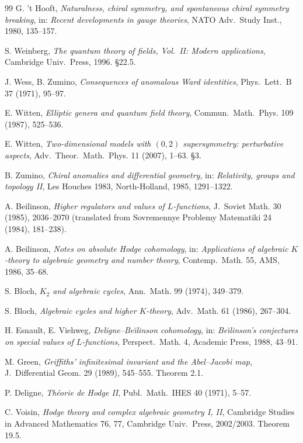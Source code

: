 \documentclass[11pt,reqno]{amsart}
\theoremstyle{plain}
\theoremstyle{definition}
\theoremstyle{remark}
\begin{document}
\begin{thebibliography}{99}
 G. 't Hooft, \emph{Naturalness, chiral symmetry, and spontaneous chiral symmetry breaking}, in: \emph{Recent developments in gauge theories}, NATO Adv.~Study Inst., 1980, 135--157.

 S. Weinberg, \emph{The quantum theory of fields, Vol.~II: Modern applications}, Cambridge Univ.~Press, 1996. \S22.5.

 J. Wess, B. Zumino, \emph{Consequences of anomalous Ward identities}, Phys.~Lett.~B 37 (1971), 95--97.

 E. Witten, \emph{Elliptic genera and quantum field theory}, Commun.~Math.~Phys. 109 (1987), 525--536.

 E. Witten, \emph{Two-dimensional models with $(0, 2)$ supersymmetry: perturbative aspects}, Adv.~Theor.~Math.~Phys. 11 (2007), 1--63. \S3.

 B. Zumino, \emph{Chiral anomalies and differential geometry}, in: \emph{Relativity, groups and topology II}, Les Houches 1983, North-Holland, 1985, 1291--1322.

 A. Beilinson, \emph{Higher regulators and values of $L$-functions}, J.~Soviet Math. 30 (1985), 2036--2070 (translated from Sovremennye Problemy Matematiki 24 (1984), 181--238).

 A. Beilinson, \emph{Notes on absolute Hodge cohomology}, in: \emph{Applications of algebraic $K$-theory to algebraic geometry and number theory}, Contemp.~Math. 55, AMS, 1986, 35--68.

 S. Bloch, \emph{$K_2$ and algebraic cycles}, Ann.~Math. 99 (1974), 349--379.

 S. Bloch, \emph{Algebraic cycles and higher $K$-theory}, Adv.~Math. 61 (1986), 267--304.

 H. Esnault, E. Viehweg, \emph{Deligne--Be\u{\i}linson cohomology}, in: \emph{Be\u{\i}linson's conjectures on special values of $L$-functions}, Perspect.~Math. 4, Academic Press, 1988, 43--91.

 M. Green, \emph{Griffiths' infinitesimal invariant and the Abel--Jacobi map}, J.~Differential Geom. 29 (1989), 545--555. Theorem 2.1.

 P. Deligne, \emph{Th\'eorie de Hodge II}, Publ.~Math.~IHES 40 (1971), 5--57.

 C. Voisin, \emph{Hodge theory and complex algebraic geometry I, II}, Cambridge Studies in Advanced Mathematics 76, 77, Cambridge Univ.\ Press, 2002/2003. Theorem 19.5.


\end{thebibliography}
\end{document}
